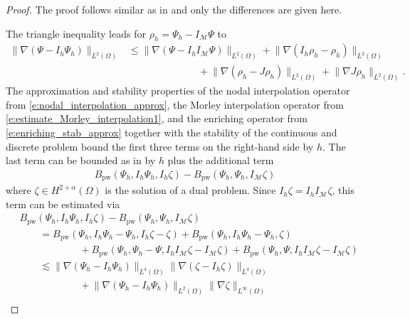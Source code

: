 \documentclass[a4paper]{amsart}
\theoremstyle{definition}
\numberwithin{equation}{section}
\numberwithin{theorem}{section}
\newcommand{\pw}{\mathrm{pw}}
\begin{document}
\begin{proof}
    The proof follows similar as in \cite[Theorem~4.7]{MallikNataraj2016}
    and only the differences are given here.
    
    The triangle inequality 
    leads for $\rho_h = \Psi_h-I_\mathcal{M}\Psi$ to 
    \begin{align*}
        \lVert \nabla(\Psi-I_h\Psi_h)\rVert_{L^2(\Omega)}
        &\leq \lVert\nabla(\Psi-I_hI_\mathcal{M}\Psi)\rVert_{L^2(\Omega)}
          + \lVert \nabla (I_h\rho_h- \rho_h)\rVert_{L^2(\Omega)}\\
        &\qquad\qquad \qquad\quad
          + \lVert \nabla (\rho_h-J\rho_h)\rVert_{L^2(\Omega)}
          + \lVert \nabla J\rho_h\rVert_{L^2(\Omega)}.
    \end{align*}
    The approximation and stability properties
    of the nodal interpolation operator from \eqref{e:nodal_interpolation_approx},
    the Morley interpolation operator from \eqref{e:estimate_Morley_interpolation1},
    and the enriching operator from \eqref{e:enriching_stab_approx}
    together with the stability of the continuous and discrete 
    problem bound the first three terms on the right-hand side 
    by $h$.
    The last term can be bounded as in \cite[Theorem~4.7]{MallikNataraj2016}
    by $h$ plus the additional term
    \begin{align*}
        B_\pw(\Psi_h,I_h\Psi_h,I_h\zeta) 
        - B_\pw(\Psi_h,\Psi_h,I_\mathcal{M}\zeta)
    \end{align*}
    where $\zeta\in H^{2+\alpha}(\Omega)$ is the solution of a dual problem.
    Since $I_h\zeta=I_h I_\mathcal{M}\zeta$, this term can be estimated via
    \begin{align*}
        &B_\pw(\Psi_h,I_h\Psi_h,I_h\zeta) 
        - B_\pw(\Psi_h,\Psi_h,I_\mathcal{M}\zeta)\\
        &\qquad 
        = B_\pw(\Psi_h,I_h\Psi_h-\Psi_h,I_h\zeta-\zeta) 
          + B_\pw(\Psi_h,I_h\Psi_h-\Psi_h,\zeta)\\
        &\qquad\qquad\qquad 
          + B_\pw(\Psi_h,\Psi_h-\Psi,I_hI_\mathcal{M}\zeta - I_\mathcal{M}\zeta)
          + B_\pw(\Psi_h,\Psi,I_hI_\mathcal{M}\zeta - I_\mathcal{M}\zeta)\\
        &\qquad 
        \lesssim \lVert\nabla(\Psi_h-I_h\Psi_h)\rVert_{L^4(\Omega)}
             \lVert \nabla (\zeta-I_h\zeta)\rVert_{L^4(\Omega)}\\
        &\qquad\qquad\qquad 
            + \lVert \nabla(\Psi_h - I_h\Psi_h)\rVert_{L^2(\Omega)} 
              \lVert \nabla \zeta\rVert_{L^\infty(\Omega)} \\

\end{align*}
\end{proof}
\end{document}
